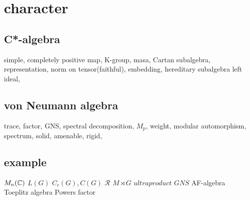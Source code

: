 
\section{character}
 \subsection{C*-algebra}
  simple, 
  completely positive map, 
  K-group, 
  masa, 
  Cartan subalgebra, 
  representation, 
  norm on tensor(faithful), 
  embedding, 
  hereditary subalgebra left ideal, 

 \subsection{von Neumann algebra}
  trace, 
  factor, 
  GNS, 
  spectral decomposition, 
  $M_p$, 
  weight, 
  modular automorphism, spectrum, 
  solid, amenable, rigid, 
  

 \subsection{example}
  $M_n(\mathbb{C})$
  $L(G)$
  $C_r(G), C(G)$
  $\mathcal{R}$
  $M \rtimes G$
  $ultraproduct$
  $GNS$
  AF-algebra
  Toeplitz algebra
  Powers factor
